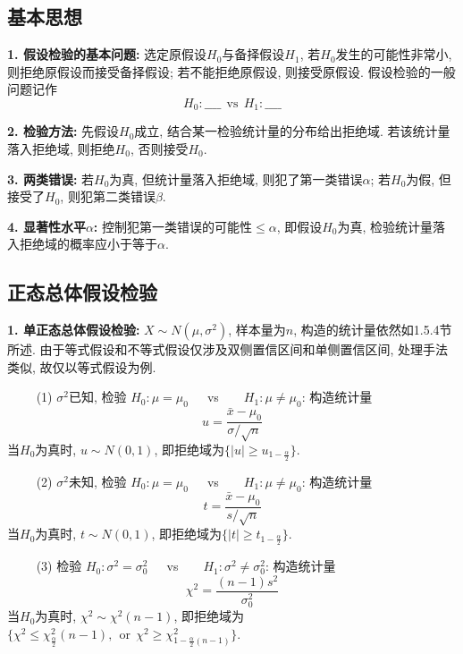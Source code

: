 \subsection{基本思想}

\textbf{1. 假设检验的基本问题: }选定原假设$H_0$与备择假设$H_1$, 若$H_0$发生的可能性非常小, 则拒绝原假设而接受备择假设; 若不能拒绝原假设, 则接受原假设. 假设检验的一般问题记作
\begin{equation*}
    H_0: \_\_\_\_  \ \ \text{vs}\ \ H_1:\_\_\_\_
\end{equation*}

\textbf{2. 检验方法: }先假设$H_0$成立, 结合某一检验统计量的分布给出拒绝域. 若该统计量落入拒绝域, 则拒绝$H_0$, 否则接受$H_0$.

\textbf{3. 两类错误: }若$H_0$为真, 但统计量落入拒绝域, 则犯了第一类错误$\alpha$; 若$H_0$为假, 但接受了$H_0$, 则犯第二类错误$\beta$.

\textbf{4. 显著性水平$\alpha$: }控制犯第一类错误的可能性$\leq \alpha$, 即假设$H_0$为真, 检验统计量落入拒绝域的概率应小于等于$\alpha$.

\subsection{正态总体假设检验}

\textbf{1. 单正态总体假设检验: }$X \sim N(\mu,\sigma^2)$, 样本量为$n$, 构造的统计量依然如1.5.4节所述. 由于等式假设和不等式假设仅涉及双侧置信区间和单侧置信区间, 处理手法类似, 故仅以等式假设为例.

~~~~ (1) $\sigma^2$已知, 检验 $H_0:\mu =\mu_0$~~~vs~~~~$H_1:\mu \neq \mu_0$: 构造统计量
\begin{equation*}
    u=\frac{\bar{x}-\mu_0}{\sigma/\sqrt{n}}
\end{equation*}
当$H_0$为真时, $u\sim N(0,1)$, 即拒绝域为$\{|u|\geq u_{1-\frac{\alpha}{2}}\}$.

~~~~ (2) $\sigma^2$未知, 检验 $H_0:\mu =\mu_0$~~~vs~~~~$H_1:\mu \neq \mu_0$: 构造统计量
\begin{equation*}
    t=\frac{\bar{x}-\mu_0}{s/\sqrt{n}}
\end{equation*}
当$H_0$为真时, $t\sim N(0,1)$, 即拒绝域为$\{|t|\geq t_{1-\frac{\alpha}{2}}\}$.

~~~~ (3) 检验 $H_0:\sigma^2 =\sigma_0^2$~~~vs~~~~$H_1:\sigma^2 \neq \sigma_0^2$: 构造统计量
\begin{equation*}
    \chi^2=\frac{(n-1)s^2}{\sigma_0^2}
\end{equation*}
当$H_0$为真时, $\chi^2 \sim \chi^2(n-1)$, 即拒绝域为$\{\chi^2 \leq \chi^2_{\frac{\alpha}{2}}(n-1),~~\text{or}~~\chi^2\geq \chi^2_{1-\frac{\alpha}{2}(n-1)}\}$.

